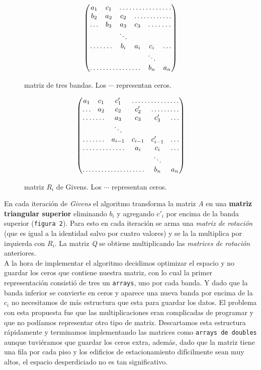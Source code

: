 \documentclass[a4paper]{article}
\begin{document}
\begin{multicols}{2}
\begin{figure}[H]
$$
 \begin{pmatrix}
   a_1 & c_1 & \hdotsfor{4} \\
   b_2 & a_2 &  c_2 & \hdotsfor{3} \\
  \hdots & b_3 & a_3 & c_3 & \hdotsfor{2} \\
   & & \ddots \\
   \hdotsfor{2} & b_i & a_i & c_i & \hdots \\
   & & & & \ddots \\
   \hdotsfor{4} & b_n & a_n \\
 \end{pmatrix}
$$
 \caption{matriz de tres bandas. Los $\cdots$ representan ceros.}
\end{figure}

\begin{figure}[H]
$$
 \begin{pmatrix}
   a_1 & c_1 & c'_1 & \hdotsfor{3} \\
   \hdots & a_2 &  c_2 & c'_2 &\hdotsfor{2} \\
   \hdotsfor{2} & a_3 & c_3 & c'_3 & \hdots \\
   & & \ddots \\
   \hdotsfor{2} & a_{i - 1} & c_{i - 1} & c'_{i - 1} & \hdots \\
   \hdotsfor{3} & a_i & c_i & \hdots \\
   & & & & \ddots \\
   \hdotsfor{4} & b_n & a_n \\
 \end{pmatrix}
$$
 \caption{matriz $R_i$ de Givens. Los $\cdots$ representan ceros.}
\end{figure}
\end{multicols}

En cada iteración de \textit{Givens} el algoritmo transforma la matriz \textit{A} en una \textbf{matriz triangular superior} eliminando $b_i$ y agregando $c'_i$ por encima de la banda superior (\texttt{figura 2}). Para esto en cada iteración se arma una \textit{matriz de rotación} (que es igual a la identidad salvo por cuatro valores) y se la la multiplica por izquierda con $R_i$. La matriz \textit{Q} se obtiene multiplicando las \textit{matrices de rotación} anteriores.\\

A la hora de implementar el algoritmo decidimos optimizar el espacio y no guardar los ceros que contiene nuestra matriz, con lo cual la primer representación consistió de tres un \texttt{arrays}, uno por cada banda. Y dado que la banda inferior se convierte en ceros y aparece una nueva banda por encima de la $c_i$ no necesitamos de más estructura que esta para guardar los datos. El problema con esta propuesta fue que las multiplicaciones eran complicadas de programar y que no podíamos representar otro tipo de matriz. Descartamos esta estructura rápidamente y terminamos implementando las matrices como \texttt{arrays de doubles} aunque tuviéramos que guardar los ceros extra, además, dado que la matriz tiene una fila por cada piso y los edificios de estacionamiento difícilmente sean muy altos, el espacio desperdiciado no es tan significativo.
\end{document}
